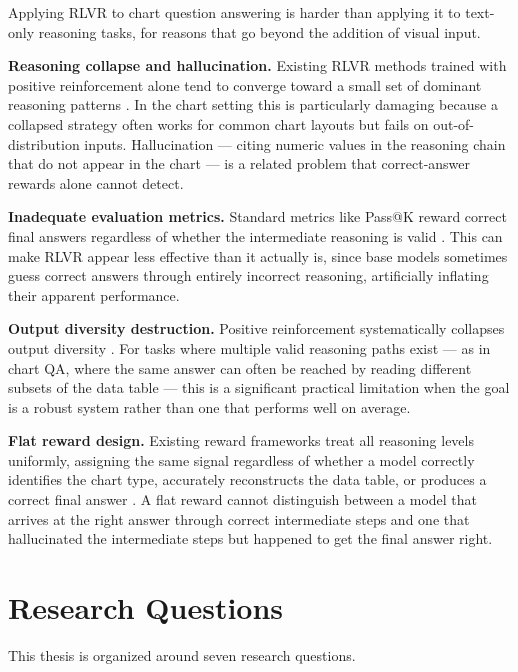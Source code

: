 \documentclass{iutbscthesis}
\begin{document}
Applying RLVR to chart question answering is harder than applying it to text-only reasoning tasks, for reasons that go beyond the addition of visual input.

\textbf{Reasoning collapse and hallucination.} Existing RLVR methods trained with positive reinforcement alone tend to converge toward a small set of dominant reasoning patterns \cite{sinha2025chartrvr, wen2025rlvr}. In the chart setting this is particularly damaging because a collapsed strategy often works for common chart layouts but fails on out-of-distribution inputs. Hallucination --- citing numeric values in the reasoning chain that do not appear in the chart --- is a related problem that correct-answer rewards alone cannot detect.

\textbf{Inadequate evaluation metrics.} Standard metrics like Pass@K reward correct final answers regardless of whether the intermediate reasoning is valid \cite{wen2025rlvr, zhu2025rlvrdecomposed}. This can make RLVR appear less effective than it actually is, since base models sometimes guess correct answers through entirely incorrect reasoning, artificially inflating their apparent performance.

\textbf{Output diversity destruction.} Positive reinforcement systematically collapses output diversity \cite{zhu2025rlvrdecomposed, sinha2025chartrvr}. For tasks where multiple valid reasoning paths exist --- as in chart QA, where the same answer can often be reached by reading different subsets of the data table --- this is a significant practical limitation when the goal is a robust system rather than one that performs well on average.

\textbf{Flat reward design.} Existing reward frameworks treat all reasoning levels uniformly, assigning the same signal regardless of whether a model correctly identifies the chart type, accurately reconstructs the data table, or produces a correct final answer \cite{sinha2025chartrvr}. A flat reward cannot distinguish between a model that arrives at the right answer through correct intermediate steps and one that hallucinated the intermediate steps but happened to get the final answer right.

\section{Research Questions}

This thesis is organized around seven research questions.
\end{document}

